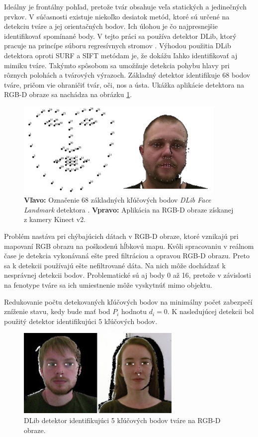 Ideálny je frontálny pohľad, pretože tvár obsahuje veľa statických a jedinečných prvkov. V súčasnosti existuje niekoľko desiatok metód, ktoré sú určené na detekciu tváre a jej orientačných bodov. Ich úlohou je čo najpresnejšie identifikovať spomínané body. V tejto práci sa používa detektor DLib, ktorý pracuje na princípe súboru regresívnych stromov \cite{king2009dlib}. Výhodou použitia DLib detektora oproti SURF a SIFT metódam je, že dokážu ľahko identifikovať aj mimiku tváre. Takýmto spôsobom sa umožňuje detekcia pohybu hlavy pri rôznych polohách a tvárových výrazoch. 
Základný detektor identifikuje 68 bodov tváre, pričom vie ohraničiť tvár, oči, nos a ústa. Ukážka aplikácie detektora na RGB-D obraze sa nachádza na obrázku \ref{fig:dlib:points}.

\begin{figure}[H]
	\centering
	\includegraphics[width=0.90\textwidth]{figures/face_landmarks.png}
	\caption{\textbf{Vľavo:} Označenie 68 základných kľúčových bodov \textit{ DLib Face Landmark} detektora \cite{king2009dlib}.  \textbf{Vpravo:} Aplikácia na RGB-D obraze získanej z kamery Kinect v2.}
	\label{fig:dlib:points}
\end{figure}
 
Problém nastáva pri chýbajúcich dátach v RGB-D obraze, ktoré vznikajú pri mapovaní RGB obrazu na poškodenú hĺbkovú mapu. Kvôli spracovaniu v reálnom čase je detekcia vykonávaná ešte pred filtráciou a opravou RGB-D obrazu. Preto sa k detekcii používajú ešte nefiltrované dáta. Na nich môže dochádzať k nesprávnej detekcii bodov. Problematické sú aj body 0 až 16, pretože v závislosti na fenotype tváre sa ich umiestnenie môže vyskytnúť mimo objektu. 

Redukovanie počtu detekovaných kľúčových bodov na minimálny počet zabezpečí zníženie stavu, kedy bude mať bod $P_i$ hodnotu $d_i=0$. K nasledujúcej detekcii bol použitý detektor identifikujúci 5 kľúčových bodov. 
 
\begin{figure}[H]
	\centering
	\includegraphics[width=0.70\textwidth]{figures/rgbd_points.png}
	\caption{DLib detektor identifikujúci 5 kľúčových bodov tváre na RGB-D obraze.}
	\label{fig:dlib:rbbd5}
\end{figure}

